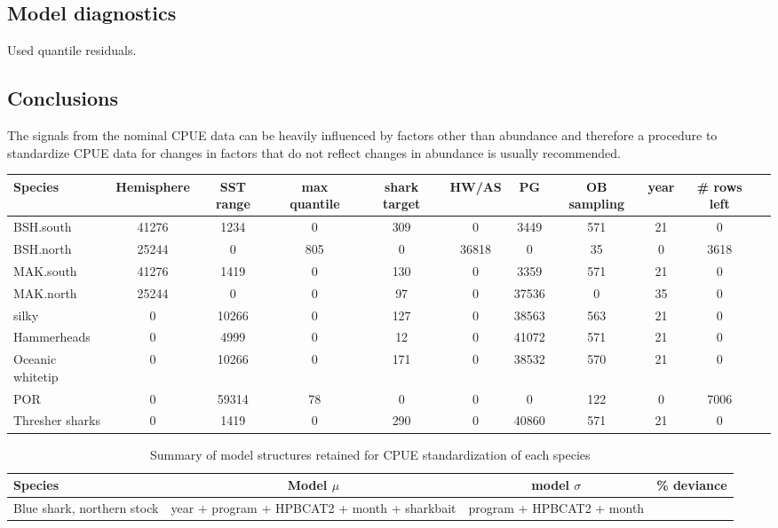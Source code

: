 \documentclass{SCreport}
\begin{document}
\subsection{Model diagnostics}
Used quantile residuals. 

\subsection{Conclusions}
The signals from the nominal  CPUE data can be heavily influenced by factors other than abundance and therefore a procedure to standardize CPUE data for changes in factors  that do not reflect changes in abundance is usually recommended. 

\clearpage
\begin{landscape}
\thispagestyle{empty}
 \begin{table}[!h]
\label{tbl:glmdata}
\begin{center}
\begin{tabular}{l|c|c|c|c|c|c|c|c|c|c}
Species & Hemisphere & SST range & max quantile & shark target & HW/AS & PG & OB sampling & year & \# rows left\\
\hline
\hline
BSH.south&41276&1234&0&309&0&3449&571&21&0&\\
BSH.north&25244&0&805&0&36818&0&35&0&3618\\
MAK.south&41276&1419&0&130&0&3359&571&21&0&\\
MAK.north&25244&0&0&97&0&37536&0&35&0&\\
silky&0&10266&0&127&0&38563&563&21&0&\\
Hammerheads&0&4999&0&12&0&41072&571&21&0&\\
Oceanic whitetip&0&10266&0&171&0&38532&570&21&0&\\
POR&0&59314&78&0&0&0&122&0&7006\\
Thresher sharks&0&1419&0&290&0&40860&571&21&0&\\
\end{tabular}
\end{center}
\end{table}
\begin{table}[!h]
\caption{Summary of model structures retained for CPUE standardization of each species}
\begin{center}
\begin{tabular}{l|c|c|c}
Species & Model $\mu$& model $\sigma$ & \% deviance\\
\hline
\hline
Blue shark, northern stock  & year + program + HPBCAT2 + month + sharkbait & program + HPBCAT2 + month&\\

\end{tabular}
\end{center}
\end{table}
\end{landscape}
\end{document}
